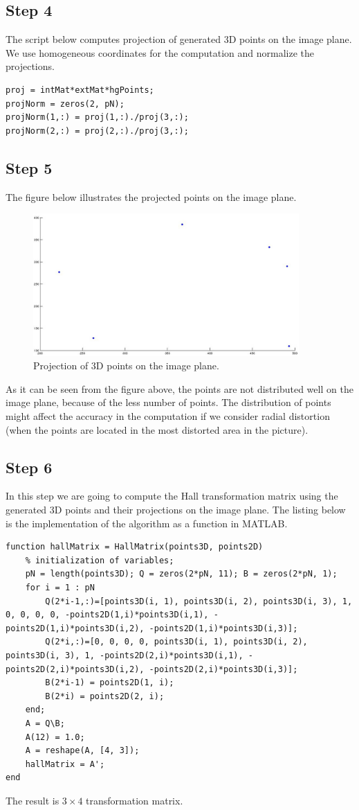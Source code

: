 \documentclass[a4paper, 10pt]{article}
\begin{document}
\subsection{Step 4}\label{step4}
The script below computes projection of generated 3D points on the image plane. We use homogeneous coordinates for the computation and normalize the projections.
\begin{lstlisting}
proj = intMat*extMat*hgPoints;
projNorm = zeros(2, pN);
projNorm(1,:) = proj(1,:)./proj(3,:);
projNorm(2,:) = proj(2,:)./proj(3,:);
\end{lstlisting}
\subsection{Step 5}\label{step5}
The figure below illustrates the projected points on the image plane.
\begin{figure}[H]
\centering
\includegraphics[width=4in]{./pics/step5}
\caption{Projection of 3D points on the image plane.}
\label{fig:step5}
\end{figure}
As it can be seen from the figure above, the points are not distributed well on the image plane, because of the less number of points. The distribution of points might affect the accuracy in the computation if we consider radial distortion (when the points are located in the most distorted area in the picture).
\subsection{Step 6}\label{step6}
In this step we are going to compute the Hall transformation matrix using the generated 3D points and their projections on the image plane. The listing below is the implementation of the algorithm as a function in MATLAB.
\begin{lstlisting}
function hallMatrix = HallMatrix(points3D, points2D)
	% initialization of variables;
    pN = length(points3D); Q = zeros(2*pN, 11); B = zeros(2*pN, 1);
    for i = 1 : pN
        Q(2*i-1,:)=[points3D(i, 1), points3D(i, 2), points3D(i, 3), 1, 0, 0, 0, 0, -points2D(1,i)*points3D(i,1), -points2D(1,i)*points3D(i,2), -points2D(1,i)*points3D(i,3)];
        Q(2*i,:)=[0, 0, 0, 0, points3D(i, 1), points3D(i, 2), points3D(i, 3), 1, -points2D(2,i)*points3D(i,1), -points2D(2,i)*points3D(i,2), -points2D(2,i)*points3D(i,3)];
        B(2*i-1) = points2D(1, i);
        B(2*i) = points2D(2, i);
    end;
    A = Q\B;
    A(12) = 1.0;
    A = reshape(A, [4, 3]);
    hallMatrix = A';
end
\end{lstlisting}
The result is $3\times4$ transformation matrix.
\end{document}
